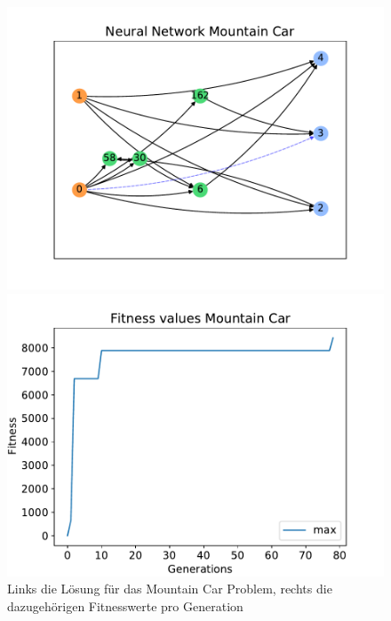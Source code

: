 \begin{figure}[!h]
	\centering
	\begin{minipage}[]{0.49\textwidth}
		\includegraphics[width=1.0\textwidth]{./img/mountain_car_single/mountain_car_neural_network.pdf} 
	\end{minipage}
	\hfill
	\begin{minipage}[]{0.49\textwidth}
		\includegraphics[width=1.0\textwidth]{./img/mountain_car_single/1413_fitness_1core_1pi.pdf} 
	\end{minipage}
	\caption{Links die Lösung für das Mountain Car Problem, rechts die dazugehörigen Fitnesswerte pro Generation}
	\label{fig:mountain_car_1core_neural_network_and_fitness}
\end{figure}
